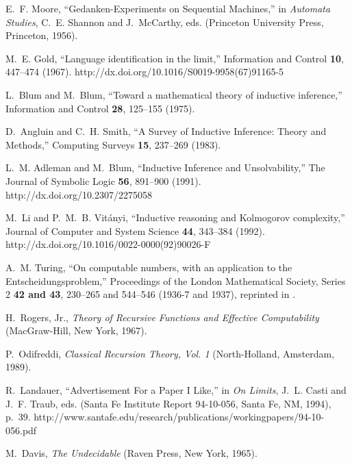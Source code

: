 \documentclass[12pt]{article}
\begin{document}
\begin{thebibliography}{10}
E.~F. Moore, \enquote{Gedanken-Experiments on Sequential Machines,} in {\em
  Automata Studies\/}, C.~E. Shannon and J.~McCarthy, eds.  (Princeton
  University Press, Princeton, 1956).

M.~E. Gold, \enquote{Language identification in the limit,} Information and
  Control {\bf 10}, 447--474 (1967).
\newline http://dx.doi.org/10.1016/S0019-9958(67)91165-5

L.~Blum and M.~Blum, \enquote{Toward a mathematical theory of inductive
  inference,} Information and Control {\bf 28}, 125--155 (1975).

D.~Angluin and C.~H. Smith, \enquote{A Survey of Inductive Inference: Theory
  and Methods,} Computing Surveys {\bf 15}, 237--269 (1983).

L.~M. Adleman and M.~Blum, \enquote{Inductive Inference and Unsolvability,} The
  Journal of Symbolic Logic {\bf 56}, 891--900 (1991).
\newline http://dx.doi.org/10.2307/2275058

M.~Li and P.~M.~B. Vit{\'{a}}nyi, \enquote{Inductive reasoning and {K}olmogorov
  complexity,} Journal of Computer and System Science {\bf 44}, 343--384
  (1992).
\newline http://dx.doi.org/10.1016/0022-0000(92)90026-F

A.~M. Turing, \enquote{On computable numbers, with an application to the
  {E}ntscheidungsproblem,} Proceedings of the London Mathematical Society,
  Series 2 {\bf 42 and 43}, 230--265 and 544--546 (1936-7 and 1937), reprinted
  in \cite{davis}.

H.~{Rogers, Jr.}, {\em Theory of Recursive Functions and Effective
  Computability\/} (MacGraw-Hill, New York, 1967).

P.~Odifreddi, {\em Classical Recursion Theory, Vol. 1\/} (North-Holland,
  Amsterdam, 1989).

R.~Landauer, \enquote{Advertisement For a Paper {I} Like,} in {\em On
  Limits\/}, J.~L. Casti and J.~F. Traub, eds.  (Santa Fe Institute Report
  94-10-056, Santa Fe, NM, 1994), p.~39.
\newline
  http://www.santafe.edu/research/publications/workingpapers/94-10-056.pdf

M.~Davis, {\em The Undecidable\/} (Raven Press, New York, 1965).

\end{thebibliography}
\end{document}
